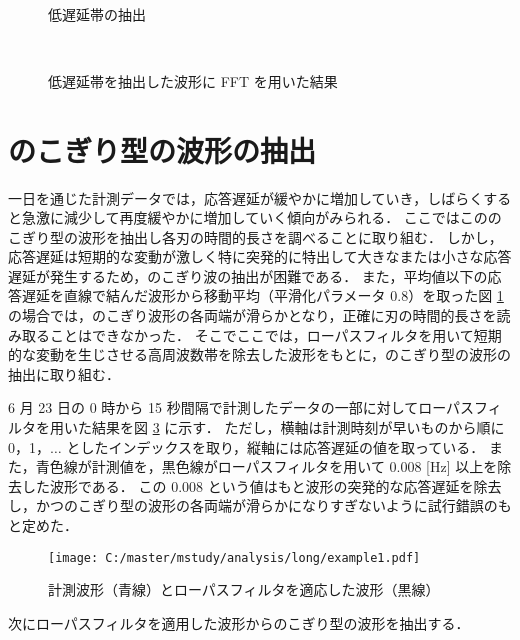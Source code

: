 \documentclass[a4j]{jarticle}
\begin{document}
\begin{figure}[tb]
\begin{center}
~
\\
\caption{低遅延帯の抽出}
\label{low}
\end{center}
\end{figure}
\begin{figure}[tb]
\begin{center}
~
~
\caption{低遅延帯を抽出した波形に FFT を用いた結果}
\label{lowfft}
\end{center}
\end{figure}

\section{のこぎり型の波形の抽出}
一日を通じた計測データでは，応答遅延が緩やかに増加していき，しばらくすると急激に減少して再度緩やかに増加していく傾向がみられる．
ここではこののこぎり型の波形を抽出し各刃の時間的長さを調べることに取り組む．
しかし，応答遅延は短期的な変動が激しく特に突発的に特出して大きなまたは小さな応答遅延が発生するため，のこぎり波の抽出が困難である．
また，平均値以下の応答遅延を直線で結んだ波形から移動平均（平滑化パラメータ 0.8）を取った図 \ref{low} の場合では，のこぎり波形の各両端が滑らかとなり，正確に刃の時間的長さを読み取ることはできなかった．
そこでここでは，ローパスフィルタを用いて短期的な変動を生じさせる高周波数帯を除去した波形をもとに，のこぎり型の波形の抽出に取り組む．

6 月 23 日の 0 時から 15 秒間隔で計測したデータの一部に対してローパスフィルタを用いた結果を図 \ref{lowpass} に示す．
ただし，横軸は計測時刻が早いものから順に 0，1，$\ldots$ としたインデックスを取り，縦軸には応答遅延の値を取っている．
また，青色線が計測値を，黒色線がローパスフィルタを用いて 0.008 [Hz] 以上を除去した波形である．
この 0.008 という値はもと波形の突発的な応答遅延を除去し，かつのこぎり型の波形の各両端が滑らかになりすぎないように試行錯誤のもと定めた．
\begin{figure}[tb]
\begin{center}
\texttt{[image: C:/master/mstudy/analysis/long/example1.pdf]}
\caption{計測波形（青線）とローパスフィルタを適応した波形（黒線）}
\label{lowpass}
\end{center}
\end{figure}
次にローパスフィルタを適用した波形からのこぎり型の波形を抽出する．
\end{document}

